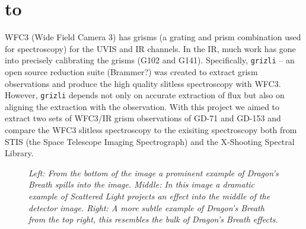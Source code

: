 \documentclass[12pt]{article}
\def\ssectionstar#1{\section*{\hbox to \hsize{\large\bf #1\hfill}}}
\begin{document}
\ssectionstar{Introduction}
\normalsize{

WFC3 (Wide Field Camera 3) has grisms (a grating and prism combination used for spectroscopy) 
for the UVIS and IR channels. In the IR, much work has gone into precisely calibrating the
grisms (G102 and G141). Specifically, \texttt{grizli} -- an open source reduction suite (Brammer?)
was created to extract grism observations and produce the high quality slitless spectroscopy with
WFC3. However, \texttt{grizli} depends not only on accurate extraction of flux but also on aligning
the extraction with the observation. With this project we aimed to extract two sets of WFC3/IR grism
observations of GD-71 and GD-153 and compare the WFC3 slitless spectroscopy to the exisiting spectroscopy
both from STIS (the Space Telescope Imaging Spectrograph) and the X-Shooting Spectral Library. 

\begin{figure}[h!]
\caption{\textit{Left: From the bottom of the image a prominent example of Dragon's Breath spills into the image. 
    Middle: In this image a dramatic example of Scattered Light projects an effect into the middle of the detector image.
    Right: A more subtle example of Dragon's Breath from the top right, this resembles the bulk of Dragon's Breath effects.}}
\label{fig:ANOMALIES}
\end{figure}


}
\end{document}
